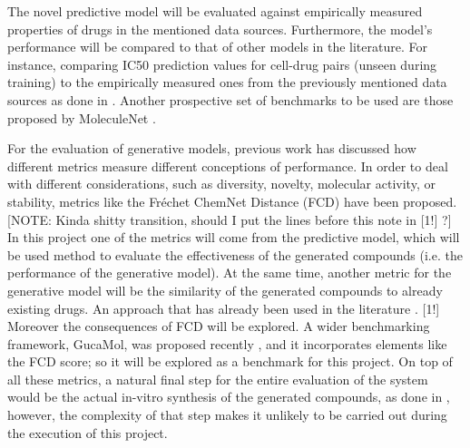 \documentclass{article}
\begin{document}
The novel predictive model will be evaluated against empirically measured properties of
 drugs in the mentioned data sources. Furthermore, the model's performance will be
 compared to that of other models in the literature. For instance, comparing IC50
 prediction values for cell-drug pairs (unseen during training) to the empirically
 measured ones from the previously mentioned data sources as done in \cite{Oskooei2019,
 Joo2019, Oskooei2018}. Another prospective set of benchmarks to be used are those
 proposed by MoleculeNet \cite{Wu2018}.

For the evaluation of generative models, previous work \cite{Theis2016} has discussed
 how different metrics measure different conceptions of performance. In order to deal
 with different considerations, such as diversity, novelty, molecular activity, or
 stability, metrics like the Fréchet ChemNet Distance (FCD) \cite{Preuer} have been
 proposed. {\color{red}[NOTE: Kinda shitty transition, should I put the lines before
 this note in [1!] ?]} In this project one of the metrics will come from the
 predictive model, which will be used method to evaluate the effectiveness of the
 generated compounds (i.e. the performance of the generative model). At the same time,
 another metric for the generative model will be the similarity of the generated
 compounds to already existing drugs. An approach that has already been used in the
 literature \cite{Born2019}. {\color{red}[1!]} Moreover the consequences of FCD will be
 explored. A wider benchmarking framework, GucaMol, was proposed recently
 \cite{Brown2019}, {\color{red} and it incorporates elements like the FCD score; so it
 will be explored as a benchmark for this project}. On top of all these metrics, a
 natural final step for the entire evaluation of the system would be the actual in-vitro
 synthesis of the generated compounds, as done in \cite{Zhavoronkov2019}, however, the
 complexity of that step makes it unlikely to be carried out during the execution of
 this project. 









    
\end{document}
